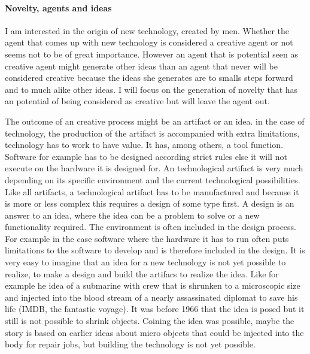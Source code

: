 

\paragraph{Novelty, agents and ideas}
I am interested in the origin of new technology, created by men. Whether the agent that comes up with new technology is considered a creative agent or not seems not to be of great importance. However an agent that is potential seen as creative agent might generate other ideas than an agent that never will be considered creative because the ideas she generates are to smalls steps forward and to much alike other ideas. I will focus on the generation of novelty that has an potential of being considered as creative but will leave the agent out.

The outcome of an creative process might be an artifact or an idea. in the case of technology, the production of the artifact is accompanied with extra limitations,  technology has to work to have value.
 It has, among others, a tool function. 
Software for example has to be designed according strict rules else it will not execute on the hardware it is designed for. An technological artifact is very much depending on its specific environment and the current technological possibilities. 
Like all artifacts, a technological artifact has to be manufactured and because it is more or less complex this requires a design of some type first.
A design is an answer to an idea, where the idea can be a problem to solve or a new functionality required.
The environment is often included in the design process. For example in the case software where the hardware it has to run often puts limitations to the software to develop and is therefore included in the design.
It is very easy to imagine that an idea for a new technology is not yet possible to realize, to make a design and build the artifacs to realize the idea. 
Like for example he idea of a submarine with crew that is shrunken to a microscopic size and injected into the blood stream of a nearly assassinated diplomat to save his life (IMDB, the fantastic voyage). It was before 1966 that the idea is posed but it still is not possible to shrink objects. 
Coining the idea was possible, maybe the story is based on earlier ideas about micro objects that could be injected into the body for repair jobs,  but building the technology is not yet possible. 

